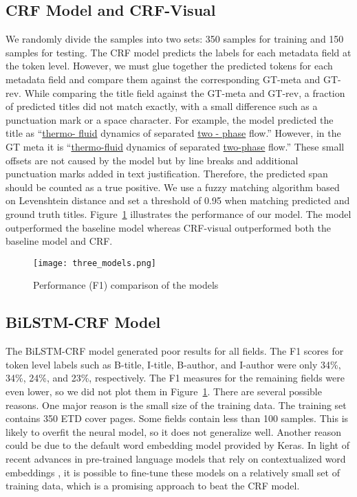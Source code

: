 \documentclass{article}
\begin{document}
\subsection{CRF Model and CRF-Visual}
We randomly divide the samples into two sets: 350 samples for training and 150 samples for testing. The CRF model predicts the labels for each metadata field at the token level. However, we must glue together the predicted tokens for each metadata field and compare them against the corresponding GT-meta and GT-rev. While comparing the title field against the GT-meta and GT-rev, a fraction of predicted titles did not match exactly, with a small difference such as a punctuation mark or a space character. For example, the model predicted the title as ``\underline{thermo- fluid} dynamics of separated \underline{two - phase} flow.'' However, in the GT meta it is ``\underline{thermo-fluid} dynamics of separated \underline{two-phase} flow.'' These small offsets are not caused by the model but by line breaks and additional punctuation marks added in text justification. Therefore, the predicted span should be counted as a true positive. We use a fuzzy matching algorithm based on Levenshtein distance and set a threshold of 0.95 when matching predicted and ground truth titles. Figure~\ref{fig: three_models} illustrates the performance of our model. The model outperformed the baseline model whereas CRF-visual outperformed both the baseline model and CRF. 

\begin{figure}[t]
    \centering
    \texttt{[image: three\_models.png]}
    \caption{Performance (F1) comparison of the models}
    \label{fig: three_models}
\end{figure}

\subsection{BiLSTM-CRF Model}
The BiLSTM-CRF model generated poor results for all fields. The F1 scores for token level labels such as B-title, I-title, B-author, and I-author were only 34\%, 34\%, 24\%, and 23\%, respectively. The F1 measures for the remaining fields were even lower, so we did not plot them in Figure~\ref{fig: three_models}. There are several possible reasons. One major reason is the small size of the training data. The training set contains 350 ETD cover pages. Some fields contain less than 100 samples. This is likely to overfit the neural model, so it does not generalize well. Another reason could be due to the default word embedding model provided by Keras. In light of recent advances in pre-trained language models that rely on contextualized word embeddings \cite{bert}, it is possible to fine-tune these models on a relatively small set of training data, which is a promising approach to beat the CRF model. 
\end{document}
